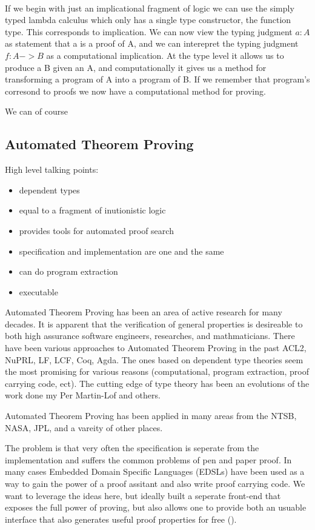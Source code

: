 \documentclass[12pt, titlepage]{article}
\begin{document}
 \\

If we begin with just an implicational fragment of logic we can use the simply typed lambda calculus which only has a
single type constructor, the function type. This corresponds to implication. We can now view the typing judgment $a : A$
as statement that a is a proof of A, and we can interepret the typing judgment $f : A -> B$ as a computational implication.
At the type level it allows us to produce a B given an A, and computationally it gives us a method for transforming a program
of A into a program of B. If we remember that program's corresond to proofs we now have a computational method for proving.

We can of course 

\subsection{Automated Theorem Proving}
High level talking points: \\
\begin{itemize}
    \item dependent types
    \item equal to a fragment of inutionistic logic
    \item provides tools for automated proof search
    \item specification and implementation are one and the same
    \item can do program extraction
    \item executable 
\end{itemize}

Automated Theorem Proving has been an area of active research for many decades. It is apparent that the
verification of general properties is desireable to both high assurance software engineers, researches, and
mathmaticians. There have been various approaches to Automated Theorem Proving in the past ACL2, NuPRL, LF,
LCF, Coq, Agda. The ones based on dependent type theories seem the most promising for various reasons 
(computational, program extraction, proof carrying code, ect). The cutting edge of type theory has been
an evolutions of the work done my Per Martin-Lof and others.

Automated Theorem Proving has been applied in many areas from the NTSB, NASA, JPL, and a vareity of other places.

The problem is that very often the specification is seperate from the implementation and suffers the common
problems of pen and paper proof. In many cases Embedded Domain Specific Languages (EDSLs)
have been used as a way to gain the power of a proof assitant and also write proof carrying code. We want
to leverage the ideas here, but ideally built a seperate front-end that exposes the full power of proving,
but also allows one to provide both an usuable interface that also generates useful proof properties for
free ().
\\
\end{document}
